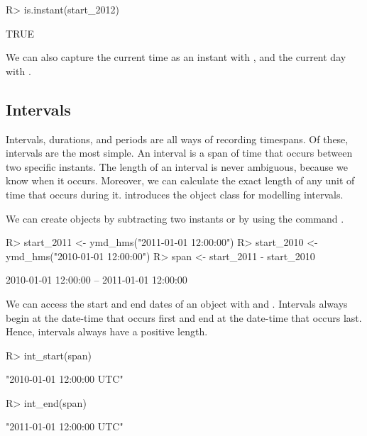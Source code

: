 \documentclass[article]{jss}
\begin{document}
\begin{CodeInput}
R> is.instant(start_2012)
\end{CodeInput}
\begin{CodeOutput}
[1] TRUE
\end{CodeOutput}

We can also capture the current time as an instant with , and the current day with .



\subsection{Intervals}
\label{sec:intervals}

Intervals, durations, and periods are all ways of recording timespans. Of these, intervals are the most simple. An interval is a span of time that occurs between two specific instants. The length of an interval is never ambiguous, because we know when it occurs. Moreover, we can calculate the exact length of any unit of time that occurs during it. introduces the  object class for modelling intervals.

We can create  objects by subtracting two instants or by using the command .

\begin{CodeInput}
R> start_2011 <- ymd_hms("2011-01-01 12:00:00")
R> start_2010 <- ymd_hms("2010-01-01 12:00:00")
R> span <- start_2011 - start_2010
\end{CodeInput}
\begin{CodeOutput}
[1] 2010-01-01 12:00:00 -- 2011-01-01 12:00:00
\end{CodeOutput}

We can access the start and end dates of an  object with  and . Intervals always begin at the date-time that occurs first and end at the date-time that occurs last. Hence, intervals always have a positive length.

\begin{CodeInput}
R> int_start(span)
\end{CodeInput}
\begin{CodeOutput}
[1] "2010-01-01 12:00:00 UTC"
\end{CodeOutput}

\begin{CodeInput}
R> int_end(span)
\end{CodeInput}
\begin{CodeOutput}
[1] "2011-01-01 12:00:00 UTC"
\end{CodeOutput}
\end{document}
